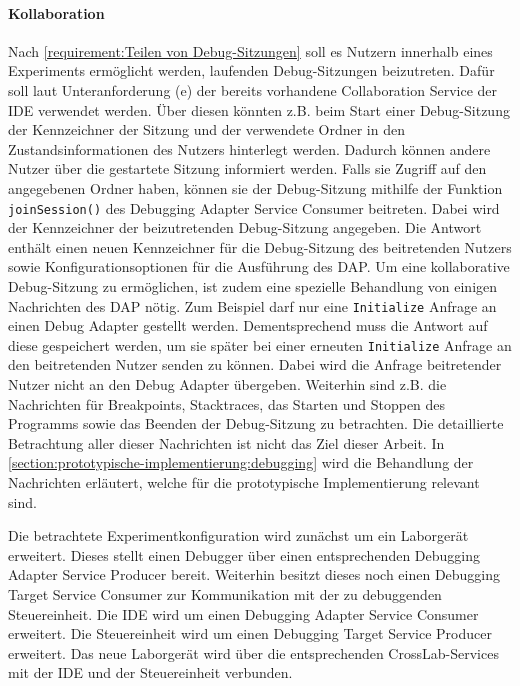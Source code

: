 \paragraph{Kollaboration} Nach \autoref{requirement:Teilen von Debug-Sitzungen} soll es Nutzern innerhalb eines Experiments ermöglicht werden, laufenden Debug-Sitzungen beizutreten. Dafür soll laut Unteranforderung (e) der bereits vorhandene Collaboration Service der IDE verwendet werden. Über diesen könnten z.B. beim Start einer Debug-Sitzung der Kennzeichner der Sitzung und der verwendete Ordner in den Zustandsinformationen des Nutzers hinterlegt werden. Dadurch können andere Nutzer über die gestartete Sitzung informiert werden. Falls sie Zugriff auf den angegebenen Ordner haben, können sie der Debug-Sitzung mithilfe der Funktion \texttt{joinSession()} des Debugging Adapter Service Consumer beitreten. Dabei wird der Kennzeichner der beizutretenden Debug-Sitzung angegeben. Die Antwort enthält einen neuen Kennzeichner für die Debug-Sitzung des beitretenden Nutzers sowie Konfigurationsoptionen für die Ausführung des \ac{DAP}. Um eine kollaborative Debug-Sitzung zu ermöglichen, ist zudem eine spezielle Behandlung von einigen Nachrichten des \ac{DAP} nötig. Zum Beispiel darf nur eine \texttt{Initialize} Anfrage an einen Debug Adapter gestellt werden. Dementsprechend muss die Antwort auf diese gespeichert werden, um sie später bei einer erneuten \texttt{Initialize} Anfrage an den beitretenden Nutzer senden zu können. Dabei wird die Anfrage beitretender Nutzer nicht an den Debug Adapter übergeben. Weiterhin sind z.B. die Nachrichten für Breakpoints, Stacktraces, das Starten und Stoppen des Programms sowie das Beenden der Debug-Sitzung zu betrachten. Die detaillierte Betrachtung aller dieser Nachrichten ist nicht das Ziel dieser Arbeit. In \autoref{section:prototypische-implementierung:debugging} wird die Behandlung der Nachrichten erläutert, welche für die prototypische Implementierung relevant sind.

Die betrachtete Experimentkonfiguration wird zunächst um ein Laborgerät erweitert. Dieses stellt einen Debugger über einen entsprechenden Debugging Adapter Service Producer bereit. Weiterhin besitzt dieses noch einen Debugging Target Service Consumer zur Kommunikation mit der zu debuggenden Steuereinheit. Die IDE wird um einen Debugging Adapter Service Consumer erweitert. Die Steuereinheit wird um einen Debugging Target Service Producer erweitert. Das neue Laborgerät wird über die entsprechenden CrossLab-Services mit der IDE und der Steuereinheit verbunden.

